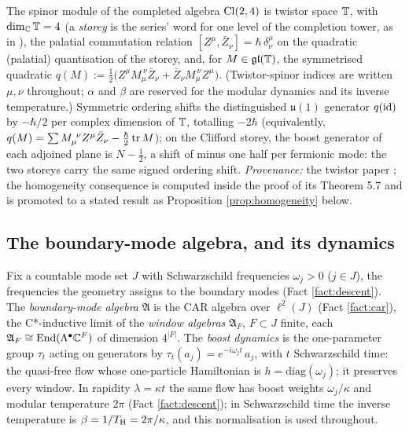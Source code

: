 \begin{fact}\label{fact:rent}
The spinor module of the completed algebra $\mathrm{Cl}(2,4)$ is twistor space $\mathbb{T}$, with $\dim_{\mathbb{C}} \mathbb{T} = 4$ (a \emph{storey} is the series' word for one level of the completion tower, as in \cite{ButlerT9}), the palatial commutation relation $[Z^\mu, \bar Z_\nu] = \hbar\,\delta^\mu_\nu$ on the quadratic (palatial) quantisation of the storey, and, for $M \in \mathfrak{gl}(\mathbb{T})$, the symmetrised quadratic $q(M) := \tfrac12\bigl(Z^\mu M_\mu^{\ \nu}\bar Z_\nu + \bar Z_\nu M_\mu^{\ \nu} Z^\mu\bigr)$. (Twistor-spinor indices are written $\mu, \nu$ throughout; $\alpha$ and $\beta$ are reserved for the modular dynamics and its inverse temperature.) Symmetric ordering shifts the distinguished $\mathfrak{u}(1)$ generator $q(\mathrm{id})$ by $-\hbar/2$ per complex dimension of $\mathbb{T}$, totalling $-2\hbar$ (equivalently, $q(M) = \sum M_\mu^{\ \nu} Z^\mu \bar Z_\nu - \tfrac{\hbar}{2}\operatorname{tr} M$); on the Clifford storey, the boost generator of each adjoined plane is $N - \tfrac12$, a shift of minus one half per fermionic mode: the two storeys carry the same signed ordering shift. \emph{Provenance:} the twistor paper \cite[Thm.~3.1, Rem.~3.2, \S 5, Lem.~5.5, Prop.~5.6, Thm.~5.7]{ButlerT9}; the homogeneity consequence is computed inside the proof of its Theorem 5.7 and is promoted to a stated result as Proposition \ref{prop:homogeneity} below.
\end{fact}

\subsection{The boundary-mode algebra, and its dynamics}\label{subsec:ledger}

\begin{definition}\label{def:ledger}
Fix a countable mode set $J$ with Schwarzschild frequencies $\omega_j > 0$ ($j \in J$), the frequencies the geometry assigns to the boundary modes (Fact \ref{fact:descent}). The \emph{boundary-mode algebra} $\mathfrak{A}$ is the CAR algebra over $\ell^2(J)$ (Fact \ref{fact:car}), the C*-inductive limit of the \emph{window algebras} $\mathfrak{A}_F$, $F \subset J$ finite, each $\mathfrak{A}_F \cong \operatorname{End}(\Lambda^\bullet \mathbb{C}^F)$ of dimension $4^{|F|}$. The \emph{boost dynamics} is the one-parameter group $\tau_t$ acting on generators by $\tau_t(a_j) = e^{-i\omega_j t}\,a_j$, with $t$ Schwarzschild time: the quasi-free flow whose one-particle Hamiltonian is $h = \mathrm{diag}(\omega_j)$; it preserves every window. In rapidity $\lambda = \kappa t$ the same flow has boost weights $\omega_j/\kappa$ and modular temperature $2\pi$ (Fact \ref{fact:descent}); in Schwarzschild time the inverse temperature is $\beta = 1/T_{\mathrm{H}} = 2\pi/\kappa$, and this normalisation is used throughout.
\end{definition}

